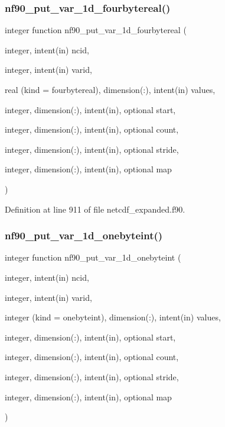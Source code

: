 \subsubsection{\texorpdfstring{nf90\+\_\+put\+\_\+var\+\_\+1d\+\_\+fourbytereal()}{nf90\_put\_var\_1d\_fourbytereal()}}
{\footnotesize\ttfamily integer function nf90\+\_\+put\+\_\+var\+\_\+1d\+\_\+fourbytereal (\begin{DoxyParamCaption}\item[{integer, intent(in)}]{ncid,  }\item[{integer, intent(in)}]{varid,  }\item[{real (kind = fourbytereal), dimension(\+:), intent(in)}]{values,  }\item[{integer, dimension(\+:), intent(in), optional}]{start,  }\item[{integer, dimension(\+:), intent(in), optional}]{count,  }\item[{integer, dimension(\+:), intent(in), optional}]{stride,  }\item[{integer, dimension(\+:), intent(in), optional}]{map }\end{DoxyParamCaption})}



Definition at line 911 of file netcdf\+\_\+expanded.\+f90.

\mbox{\label{netcdf__expanded_8f90_a4e9cd63e64bcc19bf2d40ab70c6606dd}} 
\subsubsection{\texorpdfstring{nf90\+\_\+put\+\_\+var\+\_\+1d\+\_\+onebyteint()}{nf90\_put\_var\_1d\_onebyteint()}}
{\footnotesize\ttfamily integer function nf90\+\_\+put\+\_\+var\+\_\+1d\+\_\+onebyteint (\begin{DoxyParamCaption}\item[{integer, intent(in)}]{ncid,  }\item[{integer, intent(in)}]{varid,  }\item[{integer (kind = onebyteint), dimension(\+:), intent(in)}]{values,  }\item[{integer, dimension(\+:), intent(in), optional}]{start,  }\item[{integer, dimension(\+:), intent(in), optional}]{count,  }\item[{integer, dimension(\+:), intent(in), optional}]{stride,  }\item[{integer, dimension(\+:), intent(in), optional}]{map }\end{DoxyParamCaption})}




